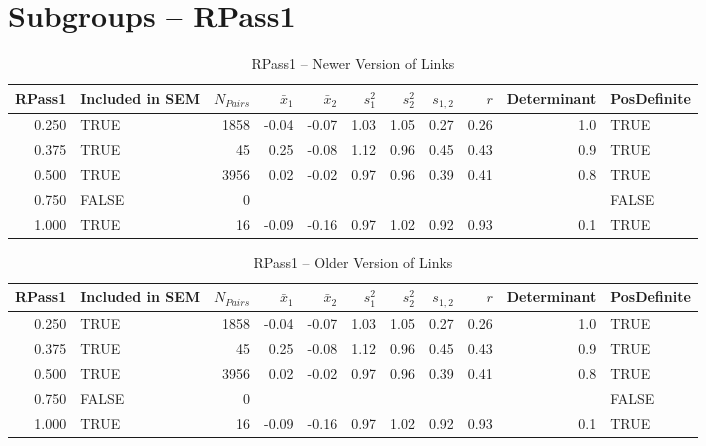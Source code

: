 \documentclass{article}\usepackage[]{graphicx}\usepackage[]{color}
\begin{document}
\section{Subgroups --  RPass1 }%
\begin{table}[ht]
\centering
\begin{tabular}{rlrrrrrrrrl}
  \hline
RPass1 & Included in SEM & $N_{Pairs}$ & $\bar{x}_1$ & $\bar{x}_2$ & $s_1^2$ & $s_2^2$ & $s_{1,2}$ & $r$ & Determinant & PosDefinite \\ 
  \hline
0.250 & TRUE & 1858 & -0.04 & -0.07 & 1.03 & 1.05 & 0.27 & 0.26 & 1.0 & TRUE \\ 
  0.375 & TRUE & 45 & 0.25 & -0.08 & 1.12 & 0.96 & 0.45 & 0.43 & 0.9 & TRUE \\ 
  0.500 & TRUE & 3956 & 0.02 & -0.02 & 0.97 & 0.96 & 0.39 & 0.41 & 0.8 & TRUE \\ 
  0.750 & FALSE & 0 &  &  &  &  &  &  &  & FALSE \\ 
  1.000 & TRUE & 16 & -0.09 & -0.16 & 0.97 & 1.02 & 0.92 & 0.93 & 0.1 & TRUE \\ 
   \hline
\end{tabular}
\caption{RPass1 -- Newer Version of Links} 
\end{table}
\begin{table}[ht]
\centering
\begin{tabular}{rlrrrrrrrrl}
  \hline
RPass1 & Included in SEM & $N_{Pairs}$ & $\bar{x}_1$ & $\bar{x}_2$ & $s_1^2$ & $s_2^2$ & $s_{1,2}$ & $r$ & Determinant & PosDefinite \\ 
  \hline
0.250 & TRUE & 1858 & -0.04 & -0.07 & 1.03 & 1.05 & 0.27 & 0.26 & 1.0 & TRUE \\ 
  0.375 & TRUE & 45 & 0.25 & -0.08 & 1.12 & 0.96 & 0.45 & 0.43 & 0.9 & TRUE \\ 
  0.500 & TRUE & 3956 & 0.02 & -0.02 & 0.97 & 0.96 & 0.39 & 0.41 & 0.8 & TRUE \\ 
  0.750 & FALSE & 0 &  &  &  &  &  &  &  & FALSE \\ 
  1.000 & TRUE & 16 & -0.09 & -0.16 & 0.97 & 1.02 & 0.92 & 0.93 & 0.1 & TRUE \\ 
   \hline
\end{tabular}
\caption{RPass1 -- Older Version of Links} 
\end{table}
\newpage 
\end{document}

